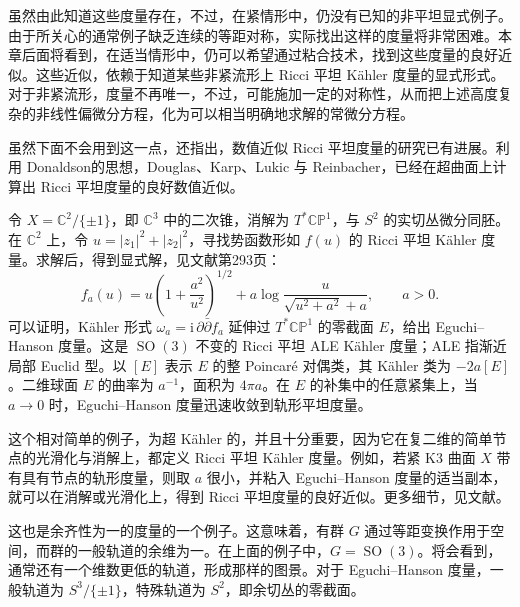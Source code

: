 虽然由此知道这些度量存在，不过，在紧情形中，仍没有已知的非平坦显式例子。由于所关心的通常例子缺乏连续的等距对称，实际找出这样的度量将非常困难。本章后面将看到，在适当情形中，仍可以希望通过粘合技术，找到这些度量的良好近似。这些近似，依赖于知道某些非紧流形上 Ricci 平坦 Kähler 度量的显式形式。对于非紧流形，度量不再唯一，不过，可能施加一定的对称性，从而把上述高度复杂的非线性偏微分方程，化为可以相当明确地求解的常微分方程。

虽然下面不会用到这一点，还指出，数值近似 Ricci 平坦度量的研究已有进展。利用 Donaldson的思想，Douglas、Karp、Lukic 与 Reinbacher，已经在超曲面上计算出 Ricci 平坦度量的良好数值近似。

\begin{example}\label{ex:7.1}
令 $X=\mathbb C^2/\{\pm1\}$，即 $\mathbb C^3$ 中的二次锥，消解为 $T^*\mathbb{CP}^1$，与 $S^2$ 的实切丛微分同胚。在 $\mathbb C^2$ 上，令 $u=|z_1|^2+|z_2|^2$，寻找势函数形如 $f(u)$ 的 Ricci 平坦 Kähler 度量。求解后，得到显式解，见文献第293页：
\[
f_a(u)=u\left(1+\frac{a^2}{u^2}\right)^{1/2}
+a\log\frac{u}{\sqrt{u^2+a^2}+a},\qquad a>0.
\]
可以证明，Kähler 形式 $\omega_a=\mathrm i\,\partial\bar\partial f_a$ 延伸过 $T^*\mathbb{CP}^1$ 的零截面 $E$，给出 Eguchi--Hanson 度量。这是 $\operatorname{SO}(3)$ 不变的 Ricci 平坦 ALE Kähler 度量；ALE 指渐近局部 Euclid 型。以 $[E]$ 表示 $E$ 的整 Poincaré 对偶类，其 Kähler 类为 $-2a[E]$。二维球面 $E$ 的曲率为 $a^{-1}$，面积为 $4\pi a$。在 $E$ 的补集中的任意紧集上，当 $a\to0$ 时，Eguchi--Hanson 度量迅速收敛到轨形平坦度量。

这个相对简单的例子，为超 Kähler 的，并且十分重要，因为它在复二维的简单节点的光滑化与消解上，都定义 Ricci 平坦 Kähler 度量。例如，若紧 K3 曲面 $X$ 带有具有节点的轨形度量，则取 $a$ 很小，并粘入 Eguchi--Hanson 度量的适当副本，就可以在消解或光滑化上，得到 Ricci 平坦度量的良好近似。更多细节，见文献。

这也是余齐性为一的度量的一个例子。这意味着，有群 $G$ 通过等距变换作用于空间，而群的一般轨道的余维为一。在上面的例子中，$G=\operatorname{SO}(3)$。将会看到，通常还有一个维数更低的轨道，形成那样的图景。对于 Eguchi--Hanson 度量，一般轨道为 $S^3/\{\pm1\}$，特殊轨道为 $S^2$，即余切丛的零截面。
\begin{figure}[H]
\centering
{}
\BookNumberOnlyCaption\label{fig:7.1}
\end{figure}


\end{example}
